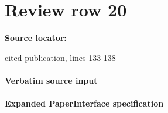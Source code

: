 \documentclass[10pt]{article}
\begin{document}
\section*{Review row 20}
\textbf{Source locator:} {\footnotesize\raggedright cited publication, lines 133-\allowbreak{}138\par}
\paragraph{Verbatim source input}
\begin{ReviewVerbatim}
\end{ReviewVerbatim}


\paragraph{Expanded PaperInterface specification}
\end{document}
